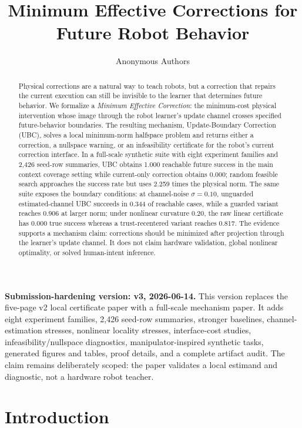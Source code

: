 \documentclass{article}
\title{Minimum Effective Corrections for Future Robot Behavior}
\author{Anonymous Authors}
\begin{document}
\maketitle

\noindent\textbf{Submission-hardening version: v3, 2026-06-14.}
This version replaces the five-page v2 local certificate paper with a full-scale
mechanism paper. It adds eight experiment families, 2,426 seed-row summaries,
stronger baselines, channel-estimation stresses, nonlinear locality stresses,
interface-cost studies, infeasibility/nullspace diagnostics, manipulator-inspired
synthetic tasks, generated figures and tables, proof details, and a complete
artifact audit. The claim remains deliberately scoped: the paper validates a
local estimand and diagnostic, not a hardware robot teacher.

\begin{abstract}
Physical corrections are a natural way to teach robots, but a correction that
repairs the current execution can still be invisible to the learner that
determines future behavior. We formalize a \emph{Minimum Effective Correction}:
the minimum-cost physical intervention whose image through the robot learner's
update channel crosses specified future-behavior boundaries. The resulting
mechanism, Update-Boundary Correction (UBC), solves a local minimum-norm
halfspace problem and returns either a correction, a nullspace warning, or an
infeasibility certificate for the robot's current correction interface. In a
full-scale synthetic suite with eight experiment families and 2,426 seed-row
summaries, UBC obtains 1.000 reachable future success in the main context
coverage setting while current-only correction obtains 0.000; random feasible
search approaches the success rate but uses 2.259 times the physical norm. The
same suite exposes the boundary conditions: at channel-noise $\sigma=0.10$,
unguarded estimated-channel UBC succeeds in 0.344 of reachable cases, while a
guarded variant reaches 0.906 at larger norm; under nonlinear curvature 0.20,
the raw linear certificate has 0.000 true success whereas a trust-recentered
variant reaches 0.817. The evidence supports a mechanism claim: corrections
should be minimized after projection through the learner's update channel. It
does not claim hardware validation, global nonlinear optimality, or solved
human-intent inference.
\end{abstract}

\section{Introduction}
\end{document}

